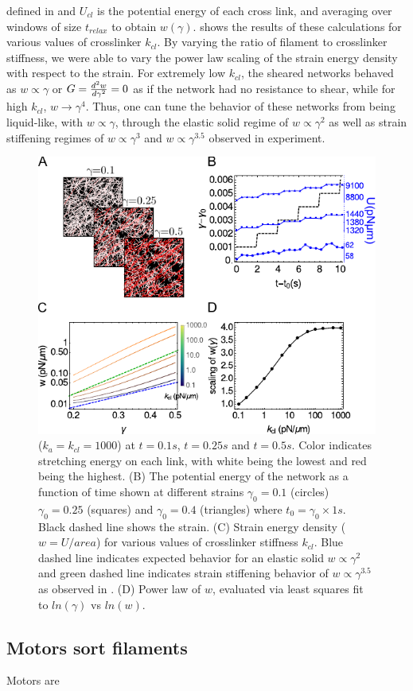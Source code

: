 \documentclass[12pt]{article} \usepackage{times} \usepackage{graphicx}
\begin{document}
  defined in  and $U_{cl}$ is the potential energy of each cross
  link, and averaging over windows of size $t_{relax}$ to obtain $w(\gamma)$.
   shows the results of these calculations for various values
  of crosslinker $k_{cl}$. By varying the ratio of filament to crosslinker
  stiffness, we were able to vary the power law scaling of the strain energy
  density with respect to the strain. For extremely low $k_{cl}$, the sheared
  networks behaved as $w\propto \gamma$ or $G={d^2w\over d\gamma^2}=0$ as if
  the network had no resistance to shear, while for high $k_{cl}$,
  $w\rightarrow\gamma^4$. Thus, one can tune the behavior of these networks
  from being liquid-like, with $w\propto\gamma$, through the elastic solid
  regime of $w\propto\gamma^2$ as well as strain stiffening regimes of
  $w\propto\gamma^3$ and $w\propto\gamma^{3.5}$ observed in
  experiment\cite{gardel2004, kasza2009}.  \begin{figure}[H] \centering
    \includegraphics[scale=1.2]{figs/elasticity/shear_result.pdf} \caption{%
      \label{fig:stress}%
      ($k_a=k_{cl}=1000$) at $t=0.1s$, $t=0.25s$ and $t=0.5s$.  Color indicates
      stretching energy on each link, with white being the lowest and red being
      the highest.  (B) The potential energy of the network as a function of
      time shown at different strains $\gamma_0=0.1$ (circles) $\gamma_0=0.25$
      (squares) and $\gamma_0=0.4$ (triangles) where $t_0=\gamma_0\times 1s$.
      Black dashed line shows the strain.   (C) Strain energy density
      ($w=U/area$) for various values of crosslinker stiffness $k_{cl}$. Blue
      dashed line indicates expected behavior for an elastic solid $w\propto
      \gamma^2$ and green dashed line indicates strain stiffening behavior of
      $w\propto \gamma^{3.5}$ as observed in \cite{gardel2004,lin2010}.  (D)
    Power law of $w$, evaluated via least squares fit to $ln(\gamma)$ vs
  $ln(w)$.  } \end{figure} \subsection{Motors sort filaments} Motors are
\end{document}
